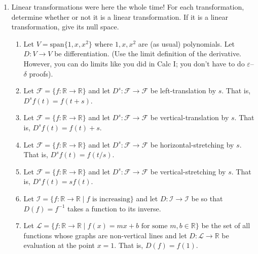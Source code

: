 \documentclass[letter]{article}
\newcommand{\R}{\mathbb{R}}
\newcommand{\Span}{\mathrm{span}}
\begin{document}
\begin{enumerate}
		\item {\sc Linear transformations were here the whole time!} For each transformation, determine
			whether or not it is a linear transformation.  If it is a linear transformation, give
			its null space.
			\begin{enumerate}
				\item Let $V=\Span\{1,x,x^2\}$ where $1,x,x^2$ are (as usual) polynomials.
					Let $D:V\to V$ be differentiation.  (Use the limit definition of 
					the derivative. However, you can
					do limits like you did in Calc I; you don't have to do $\varepsilon$--$\delta$
					proofs).
				\item Let $\mathcal F=\{f:\R\to \R\}$ and let $D^s:\mathcal F\to \mathcal F$
					be left-translation by $s$.  That is, $D^sf(t)=f(t+s)$.
				\item Let $\mathcal F=\{f:\R\to \R\}$ and let $D^s:\mathcal F\to \mathcal F$
					be vertical-translation by $s$.  That is, $D^sf(t)=f(t)+s$.
				\item Let $\mathcal F=\{f:\R\to \R\}$ and let $D^s:\mathcal F\to \mathcal F$
					be horizontal-stretching by $s$.  That is, $D^sf(t)=f(t/s)$.
				\item Let $\mathcal F=\{f:\R\to \R\}$ and let $D^s:\mathcal F\to \mathcal F$
					be vertical-stretching by $s$.  That is, $D^sf(t)=sf(t)$.
				\item Let $\mathcal I=\{f:\R\to \R\mid f\text{ is increasing}\}$ and let $D:\mathcal I\to \mathcal I$
					be so that $D(f)=f^{-1}$ takes a function to its inverse.
				\item Let $\mathcal L=\{f:\R\to \R\mid f(x)=mx+b\text{ for some }m,b\in\R\}$
					be the set of all functions whose graphs are non-vertical lines and let $D:\mathcal L\to \R$
					be evaluation at the point $x=1$.  That is, $D(f) = f(1)$.
			\end{enumerate}


\end{enumerate}
\end{document}
